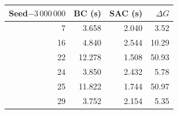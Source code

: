 \begin{tabular}{rrrr}
\toprule
Seed$-3\,000\,000$ & BC (s) & SAC (s) & $\Delta G$ \\
\midrule
7 & 3.658 & 2.040 & 3.52 \\
16 & 4.840 & 2.544 & 10.29 \\
22 & 12.278 & 1.508 & 50.93 \\
24 & 3.850 & 2.432 & 5.78 \\
25 & 11.822 & 1.744 & 50.97 \\
29 & 3.752 & 2.154 & 5.35 \\
\bottomrule
\end{tabular}
